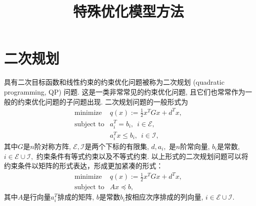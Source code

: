\documentclass{SBCbookchapter}
\author{}
\title{特殊优化模型方法}
\begin{document}
\maketitle

\section{二次规划}
\label{sec:7.2}

具有二次目标函数和线性约束的约束优化问题被称为二次规划 (quadratic programming, QP) 问题. 这是一类非常常见的约束优化问题, 且它们也常常作为一般的约束优化问题的子问题出现. 二次规划问题的一般形式为
\begin{equation}
\label{eq:quadratic-programming}
\begin{array}{cl}
\text{minimize} & q(x) := \frac{1}{2} x^T G x + d^T x, \\
\text{subject to} & a_i^T = b_i, ~~ i \in \mathcal{E}, \\
& a_i^T x \leqslant b_i, ~~ i \in \mathcal{I},
\end{array}
\end{equation}
其中$G$是$n$阶对称方阵, $\mathcal{E}, \mathcal{I}$是两个下标的有限集, $d, a_i,$ 是$n$阶常向量, $b_i$是常数, $i \in \mathcal{E} \cup \mathcal{I},$ 约束条件有等式约束以及不等式约束. 以上形式的二次规划问题可以将约束条件以矩阵的形式表达，形成更加紧凑的形式：
\begin{equation}
\label{eq:quadratic-programming}
\begin{array}{cl}
\text{minimize} & q(x) := \frac{1}{2} x^T G x + d^T x, \\
\text{subject to} & A x \preccurlyeq b,
\end{array}
\end{equation}
其中$A$是行向量$a_i^T$排成的矩阵, $b$是常数$b_i$按相应次序排成的列向量, $i \in \mathcal{E} \cup \mathcal{I}.$




\end{document}
